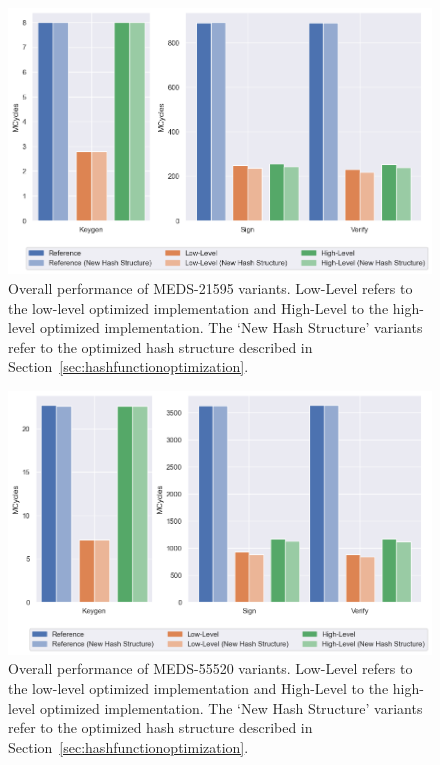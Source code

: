 \documentclass[11pt,a4paper]{report}
\theoremstyle{definition}
\begin{document}
\begin{figure}
  \centering
  \includegraphics[width=\textwidth]{plots/barplot_MEDS-21595.png}
  \caption{Overall performance of MEDS-21595 variants. Low-Level refers to the low-level optimized implementation and High-Level to the high-level optimized implementation. The `New Hash Structure' variants refer to the optimized hash structure described in Section~\ref{sec:hashfunctionoptimization}.}
  \label{fig:overal_performance_bar_chart_MEDS-21595}
\end{figure}

\begin{figure}
  \centering
  \includegraphics[width=\textwidth]{plots/barplot_MEDS-55520.png}
  \caption{Overall performance of MEDS-55520 variants. Low-Level refers to the low-level optimized implementation and High-Level to the high-level optimized implementation. The `New Hash Structure' variants refer to the optimized hash structure described in Section~\ref{sec:hashfunctionoptimization}.}
  \label{fig:overal_performance_bar_chart_MEDS-55520}
\end{figure}
\end{document}

